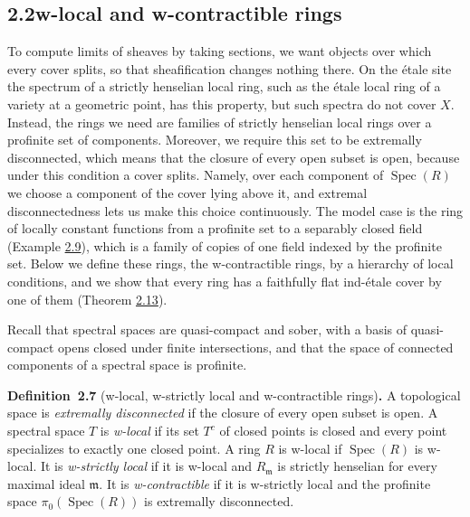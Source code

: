 \documentclass[11pt]{article}
\newenvironment{bpstatement}[2]{\par\addvspace{0.6\baselineskip}\noindent\textbf{#1}#2\textbf{.}\enspace\ignorespaces}
  {\par\addvspace{0.4\baselineskip}}
\begin{document}
\subsection*{\texorpdfstring{2.2\quad w-local and w-contractible rings}{2.2 w-local and w-contractible rings}}
\label{bp21}%
\label{bp22}%
To compute limits of sheaves by taking sections, we want objects over which every cover splits, so that sheafification changes nothing there. On the étale site the spectrum of a strictly henselian local ring, such as the étale local ring of a variety at a geometric point, has this property, but such spectra do not cover \(X\). Instead, the rings we need are families of strictly henselian local rings over a profinite set of components. Moreover, we require this set to be extremally disconnected, which means that the closure of every open subset is open, because under this condition a cover splits. Namely, over each component of \(\operatorname{Spec}(R)\) we choose a component of the cover lying above it, and extremal disconnectedness lets us make this choice continuously. The model case is the ring of locally constant functions from a profinite set to a separably closed field (Example \hyperref[bp28]{2.9}), which is a family of copies of one field indexed by the profinite set. Below we define these rings, the w-contractible rings, by a hierarchy of local conditions, and we show that every ring has a faithfully flat ind-étale cover by one of them (Theorem \hyperref[bp39]{2.13}).

Recall that spectral spaces are quasi-compact and sober, with a basis of quasi-compact opens closed under finite intersections, and that the space of connected components of a spectral space is profinite.

\label{bp23}%
\begin{bpstatement}{Definition~2.7}{ (w-local, w-strictly local and w-contractible rings)}
A topological space is \emph{extremally disconnected} if the closure of every open subset is open. A spectral space \(T\) is \emph{w-local} if its set \(T^c\) of closed points is closed and every point specializes to exactly one closed point. A ring \(R\) is w-local if \(\operatorname{Spec}(R)\) is w-local. It is \emph{w-strictly local} if it is w-local and \(R_{\mathfrak m}\) is strictly henselian for every maximal ideal \(\mathfrak m\). It is \emph{w-contractible} if it is w-strictly local and the profinite space \(\pi_0(\operatorname{Spec}(R))\) is extremally disconnected.
\end{bpstatement}
\end{document}
